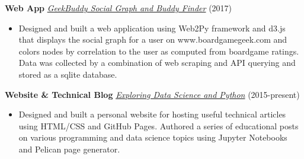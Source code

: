 \documentclass[
]{report}
\providecommand{\tightlist}{%
  \setlength{\itemsep}{0pt}\setlength{\parskip}{0pt}}\usepackage{longtable,booktabs,array}
\begin{document}
\textbf{Web App}
\href{http://sdsawtelle.pythonanywhere.com}{\emph{GeekBuddy Social Graph
and Buddy Finder}} (2017)

\begin{itemize}
\tightlist
\item
  Designed and built a web application using Web2Py framework and d3.js
  that displays the social graph for a user on www.boardgamegeek.com and
  colors nodes by correlation to the user as computed from boardgame
  ratings. Data was collected by a combination of web scraping and API
  querying and stored as a sqlite database.
\end{itemize}

\textbf{Website \& Technical Blog}
\href{http://sdsawtelle.github.io/blog/output/index.html}{\emph{Exploring
Data Science and Python}} (2015-present)

\begin{itemize}
\tightlist
\item
  Designed and built a personal website for hosting useful technical
  articles using HTML/CSS and GitHub Pages. Authored a series of
  educational posts on various programming and data science topics using
  Jupyter Notebooks and Pelican page generator.
\end{itemize}
\end{document}
